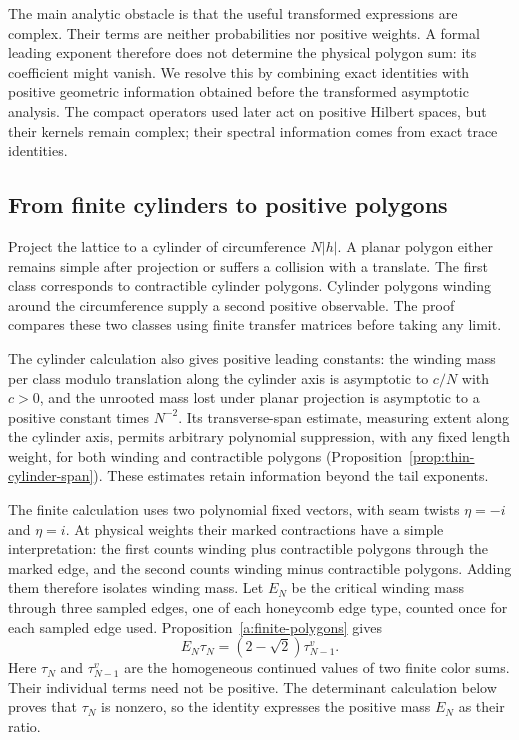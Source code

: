 The main analytic obstacle is that the useful transformed expressions
are complex.  Their terms are neither probabilities nor positive
weights.  A formal leading exponent therefore does not determine the
physical polygon sum: its coefficient might vanish.  We resolve this by
combining exact identities with positive geometric information obtained
before the transformed asymptotic analysis.  The compact operators used
later act on positive Hilbert spaces, but their kernels remain complex;
their spectral information comes from exact trace identities.

\subsection{From finite cylinders to positive polygons}

Project the lattice to a cylinder of circumference $N|h|$.  A planar
polygon either remains simple after projection or suffers a collision
with a translate.  The first class corresponds to contractible cylinder
polygons.  Cylinder polygons winding around the circumference supply a
second positive observable.  The proof compares these two classes using
finite transfer matrices before taking any limit.

The cylinder calculation also gives positive leading constants: the winding mass per class modulo translation along the cylinder axis is asymptotic to $c/N$ with $c>0$, and the unrooted mass lost under planar projection is asymptotic to a positive constant times $N^{-2}$. Its transverse-span estimate, measuring extent along the cylinder axis, permits arbitrary polynomial suppression, with any fixed length weight, for both winding and contractible polygons (Proposition~\ref{prop:thin-cylinder-span}). These estimates retain information beyond the tail exponents.

The finite calculation uses two polynomial fixed vectors, with seam
twists $\eta=-i$ and $\eta=i$. At physical weights their marked
contractions have a simple interpretation: the first counts winding
plus contractible polygons through the marked edge, and the second
counts winding minus contractible polygons. Adding them therefore
isolates winding mass. Let $E_N$ be the critical winding mass through
three sampled edges, one of each honeycomb edge type, counted once for
each sampled edge used. Proposition~\ref{a:finite-polygons} gives
\[
                 E_N\tau_N=(2-\sqrt2)\tau^v_{N-1}.
\]
Here $\tau_N$ and $\tau^v_{N-1}$ are the homogeneous continued values of
two finite color sums. Their individual terms need not be positive.
The determinant calculation below proves that $\tau_N$ is nonzero, so
the identity expresses the positive mass $E_N$ as their ratio.

